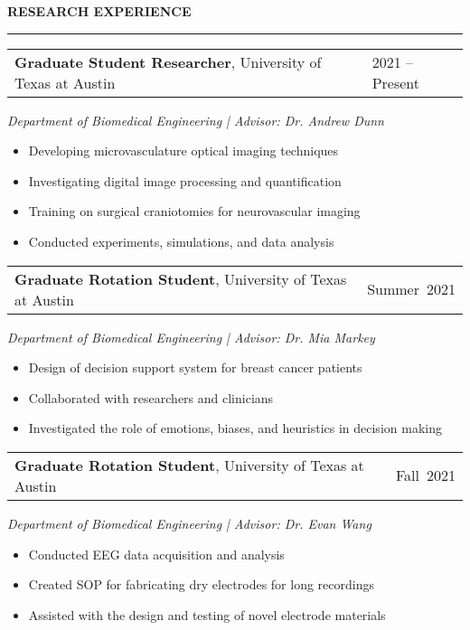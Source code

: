 \documentclass[12pt]{article}
\newcommand{\sectionheading}[1]{%
    \vspace{1.2ex}%
    {\large\bfseries\MakeUppercase{#1}}\par\vspace{0.3ex}%
    {\color[gray]{0.6}\rule{0.98\linewidth}{0.3pt}}\vspace{0.6ex}%
  }
\newcommand{\sectionheading}[1]{%
    \vspace{1.2ex}%
    {\large\bfseries{\SansHead \MakeUppercase{#1}}}\par\vspace{0.3ex}%
    {\color[gray]{0.6}\rule{0.98\linewidth}{0.3pt}}\vspace{0.6ex}%
  }
\begin{document}
\sectionheading{Research Experience}

\noindent\begin{tabular*}{\textwidth}{@{}p{} p{}@{}}\textbf{Graduate Student Researcher}, University of Texas at Austin & 2021 -- Present\\\end{tabular*}
\vspace{0.6ex}
\textit{Department of Biomedical Engineering \;|\; Advisor: Dr. Andrew Dunn}
\begin{itemize}
  \item Developing microvasculature optical imaging techniques
  \item Investigating digital image processing and quantification
  \item Training on surgical craniotomies for neurovascular imaging
  \item Conducted experiments, simulations, and data analysis
\end{itemize}

\noindent\begin{tabular*}{\textwidth}{@{}p{} p{}@{}}\textbf{Graduate Rotation Student}, University of Texas at Austin & Summer~2021\\\end{tabular*}
\vspace{0.6ex}
\textit{Department of Biomedical Engineering \;|\; Advisor: Dr. Mia Markey}
\begin{itemize}
  \item Design of decision support system for breast cancer patients
  \item Collaborated with researchers and clinicians
  \item Investigated the role of emotions, biases, and heuristics in decision making
\end{itemize}

\noindent\begin{tabular*}{\textwidth}{@{}p{} p{}@{}}\textbf{Graduate Rotation Student}, University of Texas at Austin & Fall~2021\\\end{tabular*}
\vspace{0.6ex}
\textit{Department of Biomedical Engineering \;|\; Advisor: Dr. Evan Wang}
\begin{itemize}
  \item Conducted EEG data acquisition and analysis
  \item Created SOP for fabricating dry electrodes for long recordings
  \item Assisted with the design and testing of novel electrode materials
\end{itemize}
\end{document}
